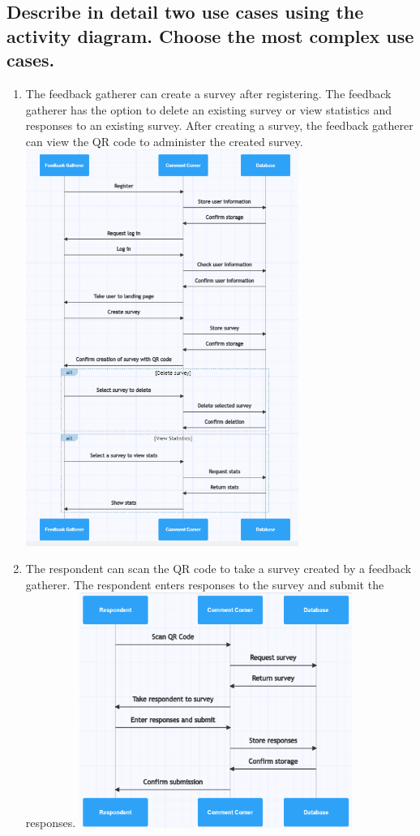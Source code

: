 \documentclass[letterpaper, 12 pt, conference]{ieeeconf}
\begin{document}
\subsection{Describe in detail two use cases using the activity diagram. Choose the most complex use cases.}
\begin{enumerate}
    \item The feedback gatherer can create a survey after registering. The feedback gatherer has the option to delete an existing survey or view statistics and responses to an existing survey. After creating a survey, the feedback gatherer can view the QR code to administer the created survey.
    \includegraphics[width=0.70\textwidth]{feedbackGatherer.png}
\newpage
    \item The respondent can scan the QR code to take a survey created by a feedback gatherer. The respondent enters responses to the survey and submit the responses.
    \includegraphics[width=0.70\textwidth]{respondent.png}
\end{enumerate}
\end{document}
